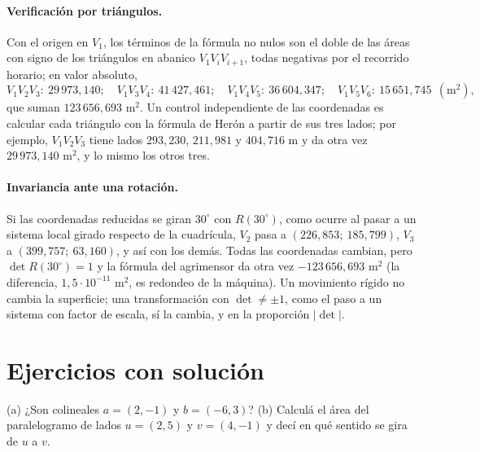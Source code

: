\paragraph{Verificación por triángulos.} Con el origen en \(V_1\), los términos de la fórmula
no nulos son el doble de las áreas con signo de los triángulos en abanico \(V_1V_iV_{i+1}\),
todas negativas por el recorrido horario; en valor absoluto,
\[
  V_1V_2V_3:\ 29\,973{,}140;\quad V_1V_3V_4:\ 41\,427{,}461;\quad
  V_1V_4V_5:\ 36\,604{,}347;\quad V_1V_5V_6:\ 15\,651{,}745\ \ (\text{m}^2),
\]
que suman \(123\,656{,}693\) m\(^2\). Un control independiente de las coordenadas es calcular
cada triángulo con la fórmula de Herón a partir de sus tres lados; por ejemplo,
\(V_1V_2V_3\) tiene lados \(293{,}230\), \(211{,}981\) y \(404{,}716\) m y da otra vez
\(29\,973{,}140\) m\(^2\), y lo mismo los otros tres.

\paragraph{Invariancia ante una rotación.} Si las coordenadas reducidas se giran \(30^\circ\)
con \(R(30^\circ)\), como ocurre al pasar a un sistema local girado respecto de la
cuadrícula, \(V_2\) pasa a \((226{,}853;\ 185{,}799)\), \(V_3\) a \((399{,}757;\ 63{,}160)\), y
así con los demás. Todas las coordenadas cambian, pero \(\det R(30^\circ)=1\) y la fórmula
del agrimensor da otra vez \(-123\,656{,}693\) m\(^2\) (la diferencia, \(1{,}5\cdot10^{-11}\)
m\(^2\), es redondeo de la máquina). Un movimiento rígido no cambia la superficie; una
transformación con \(\det\neq\pm1\), como el paso a un sistema con factor de escala, sí la
cambia, y en la proporción \(|\det|\).

\section{Ejercicios con solución}

\begin{ejercicio}\label{ex:cuna-colineales}
(a) ¿Son colineales \(a=(2,-1)\) y \(b=(-6,3)\)? (b) Calculá el área del paralelogramo de
lados \(u=(2,5)\) y \(v=(4,-1)\) y decí en qué sentido se gira de \(u\) a \(v\).
\end{ejercicio}

